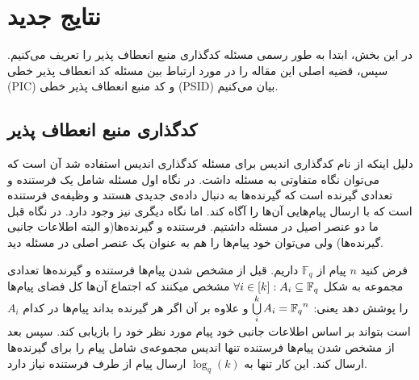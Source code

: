  
\section{نتایج جدید}\label{sec3}
در این بخش، ابتدا به طور رسمی مسئله کدگذاری منبع انعطاف پذیر را تعریف می‌کنیم. سپس، قضیه اصلی این مقاله را در مورد ارتباط بین مسئله کد انعطاف پذیر خطی (PIC) و کد منبع انعطاف پذیر خطی (PSID) بیان می‌کنیم.
\subsection{
		کدگذاری منبع انعطاف پذیر
}
\begin{recal}
	دلیل اینکه از نام کدگذاری اندیس برای مسئله کدگذاری اندیس استفاده شد آن است که می‌توان نگاه متفاوتی به مسئله داشت. در نگاه اول مسئله شامل یک فرستنده و تعدادی گیرنده است که گیرنده‌ها به دنبال داده‌ی جدیدی هستند و وظیفه‌ی فرستنده است که با ارسال پیام‌هایی آن‌ها را آگاه کند. اما نگاه دیگری نیز وجود دارد. در نگاه قبل ما دو عنصر اصیل در مسئله داشتیم. فرستنده و گیرنده‌ها(و البته اطلاعات جانبی گیرنده‌ها) ولی می‌توان خود پیام‌ها را هم به عنوان یک عنصر اصلی در مسئله دید.
	
فرض کنید 
$n$
پیام‌ از
$\mathbb{F}_q$
 داریم. قبل از مشخص شدن پیام‌ها فرستنده و گیرنده‌ها تعدادی مجموعه به شکل
 $\forall i \in [k]: A_i \subseteq {\mathbb{F}_q}$
 مشخص میکنند که اجتماع آن‌ها کل فضای پیام‌ها را پوشش دهد یعنی:
 $ \bigcup\limits_i^k A_i = {\mathbb{F}_q}^n $
 و علاوه بر آن اگر هر گیرنده بداند پیام‌ها در کدام
 $A_i$
 است بتواند بر اساس اطلاعات جانبی خود پیام مورد نظر خود را بازیابی کند. سپس بعد از مشخص شدن پیام‌ها فرستنده تنها اندیس مجموعه‌ی شامل پیام را برای گیرنده‌ها ارسال کند. این کار تنها به
 $\log_q(k)$
 ارسال پیام از طرف فرستنده نیاز دارد.
\end{recal}
